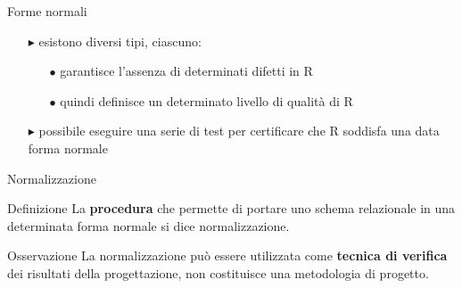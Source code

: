 \documentclass{beamer}
\begin{document}
\begin{frame}{Forme normali}

    \begin{itemize}
        \item[$\blacktriangleright$] esistono diversi tipi, ciascuno:
            \begin{itemize}
                \item[$\bullet$] garantisce l'assenza di determinati difetti in R
                \item[$\bullet$] quindi definisce un determinato livello di qualità di R
            \end{itemize}
        \item[$\blacktriangleright$] possibile eseguire una serie di test per certificare che R soddisfa una data forma normale
    \end{itemize}
\end{frame}

\begin{frame}{Normalizzazione}
    \begin{block}{Definizione}
        La \textbf{procedura} che permette di portare uno schema relazionale in una determinata forma normale si dice normalizzazione.
    \end{block}
    
    \begin{block}{Osservazione}
        La normalizzazione può essere utilizzata come \textbf{tecnica di verifica} dei risultati della progettazione, non costituisce una metodologia di progetto.
    \end{block}
\end{frame}
\end{document}
